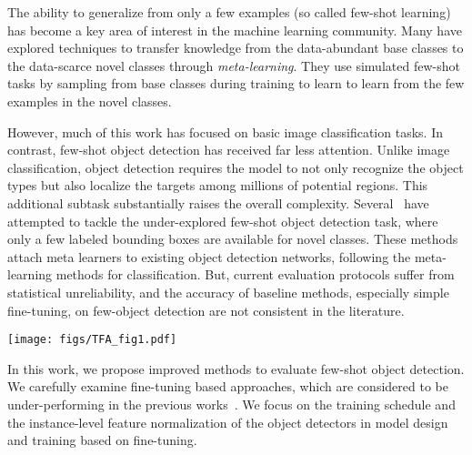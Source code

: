 \documentclass{article}
\newcommand{\model}{TFA\xspace}
\begin{document}
The ability to generalize from only a few examples (so called few-shot learning) has become a key area of interest in the machine learning community.
Many \cite{vinyals2016matching,snell2017prototypical,finn2017model,hariharan2017low,gidaris2018dynamic,wang2019tafe} have explored techniques to transfer knowledge from the data-abundant base classes to the data-scarce novel classes through \emph{meta-learning}. 
They use simulated few-shot tasks by sampling from base classes during training to learn to learn from the few examples in the novel classes.

However, much of this work has focused on basic image classification tasks. 
In contrast, few-shot object detection has received far less attention. 
Unlike image classification, object detection requires the model to not only recognize the object types but also localize the targets among millions of potential regions. This additional subtask substantially
raises the overall complexity. Several~\cite{kang2019few,yan2019meta,wang2019meta} have attempted to tackle the under-explored few-shot object detection task, where only a few labeled bounding boxes are available for novel classes. These methods attach meta learners to existing object detection networks, following the meta-learning methods for classification. But, current evaluation protocols suffer from statistical unreliability, and the accuracy of baseline methods, especially simple fine-tuning, on few-object detection are not consistent in the literature.




\begin{figure*}[ht]
    \centering
    \texttt{[image: figs/TFA\_fig1.pdf]}
    \vspace{-1cm}
    \caption{Illustration of our two-stage fine-tuning approach (\model). In the base training stage, the entire object detector, including both the feature extractor  and the box predictor, are jointly trained on the base classes. In the few-shot fine-tuning stage, the feature extractor components are fixed and only the box predictor is fine-tuned on a balanced subset consisting of both the base and novel classes.}
    \label{fig:tfa_arch}
\end{figure*}

In this work, we propose improved methods to evaluate few-shot object detection. We carefully examine fine-tuning based approaches, which are 
considered to be under-performing in the previous works~\cite{kang2019few,yan2019meta,wang2019meta}.
We focus on the training schedule and the instance-level feature normalization of the object detectors in model design and training based on fine-tuning.
\end{document}
